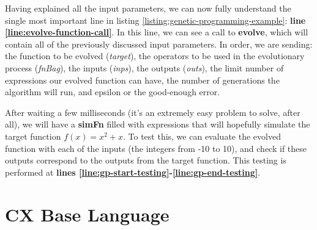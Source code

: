 \documentclass[11pt,fleqn,openany]{book} %
\begin{document}
Having explained all the input parameters, we can now fully understand the single most important line in listing \ref{listing:genetic-programming-example}: \textbf{line \ref{line:evolve-function-call}}. In this line, we can see a call to \textbf{evolve}, which will contain all of the previously discussed input parameters. In order, we are sending: the function to be evolved (\emph{target}), the operators to be used in the evolutionary process (\emph{fnBag}), the inputs (\emph{inps}), the outputs (\emph{outs}), the limit number of expressions our evolved function can have, the number of generations the algorithm will run, and epsilon or the good-enough error.

After waiting a few milliseconds (it's an extremely easy problem to solve, after all), we will have a \textbf{simFn} filled with expressions that will hopefully simulate the target function $f(x) = x^2 + x$. To test this, we can evaluate the evolved function with each of the inputs (the integers from -10 to 10), and check if these outputs correspond to the outputs from the target function. This testing is performed at \textbf{lines \ref{line:gp-start-testing}-\ref{line:gp-end-testing}}.


\chapter{CX Base Language}
\label{chapter:creating-your-own-cx}

\end{document}

